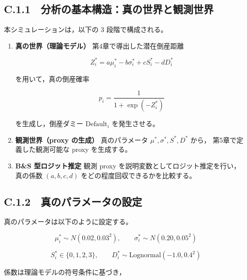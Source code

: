 \subsection*{C.1.1　分析の基本構造：真の世界と観測世界}

本シミュレーションは，以下の 3 段階で構成される。

\begin{enumerate}
    \item \textbf{真の世界（理論モデル）}  
    第4章で導出した潜在倒産距離
    


\[
        Z^{\ast}_i = a \mu^{\ast}_i - b \sigma^{\ast}_i + c S^{\ast}_i - d D^{\ast}_i
    \]



    を用いて，真の倒産確率
    


\[
        p_i = \frac{1}{1 + \exp(-Z^{\ast}_i)}
    \]



    を生成し，倒産ダミー $\text{Default}_i$ を発生させる。

    \item \textbf{観測世界（proxy の生成）}  
    真のパラメータ $\mu^{\ast}, \sigma^{\ast}, S^{\ast}, D^{\ast}$ から，
    第5章で定義した観測可能な proxy を生成する。

    \item \textbf{B\&S 型ロジット推定}  
    観測 proxy を説明変数としてロジット推定を行い，
    真の係数 $(a,b,c,d)$ をどの程度回収できるかを比較する。
\end{enumerate}

\subsection*{C.1.2　真のパラメータの設定}

真のパラメータは以下のように設定する。



\[
\mu^{\ast}_i \sim N(0.02, 0.03^2), \qquad
\sigma^{\ast}_i \sim N(0.20, 0.05^2)
\]





\[
S^{\ast}_i \in \{0,1,2,3\}, \qquad
D^{\ast}_i \sim \mathrm{Lognormal}(-1.0, 0.4^2)
\]



係数は理論モデルの符号条件に基づき，




